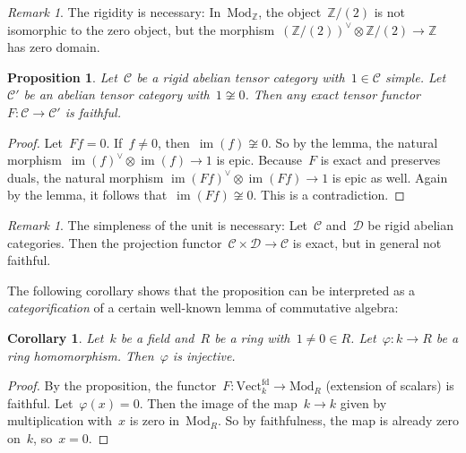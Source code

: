 \documentclass[a4paper,english,12pt]{scrartcl}
\theoremstyle{definition}
\theoremstyle{plain}
\newtheorem{prop}[defn]{Proposition}
\newtheorem{cor}[defn]{Corollary}
\theoremstyle{remark}
\newtheorem{rem}[defn]{Remark}
\newcommand{\ZZ}{\mathbb{Z}}
\newcommand{\C}{\mathcal{C}}
\newcommand{\D}{\mathcal{D}}
\renewcommand{\_}{\mathpunct{.}\,}
\newcommand{\?}{\,{:}\,}
\newcommand{\Mod}{\mathrm{Mod}}
\newcommand{\Vect}{\mathrm{Vect}}
\newcommand{\im}{\operatorname{im}}
\begin{document}
\begin{rem}The rigidity is necessary: In~$\Mod_\ZZ$, the object~$\ZZ/(2)$ is
not isomorphic to the zero object, but the morphism~$(\ZZ/(2))^\vee \otimes
\ZZ/(2) \to \ZZ$ has zero domain.\end{rem}

\begin{prop}Let~$\C$ be a rigid abelian tensor category with~$1 \in \C$ simple.
Let~$\C'$ be an abelian tensor category with~$1 \not\cong 0$. Then any exact
tensor functor~$F : \C \to \C'$ is faithful.\end{prop}
\begin{proof}Let~$Ff = 0$. If~$f \neq 0$, then~$\im(f) \not\cong 0$. So by the
lemma, the natural morphism~$\im(f)^\vee \otimes \im(f) \to 1$ is epic.
Because~$F$ is exact and preserves duals, the natural morphism
$\im(Ff)^\vee \otimes \im(Ff) \to 1$ is epic as well. Again by the lemma, it
follows that~$\im(Ff) \not\cong 0$. This is a contradiction.\end{proof}

\begin{rem}The simpleness of the unit is necessary: Let~$\C$ and~$\D$ be rigid abelian
categories. Then the projection functor~$\C \times \D \to \C$
is exact, but in general not faithful.\end{rem}

The following corollary shows that the proposition can be interpreted as a
\emph{categorification} of a certain well-known lemma of commutative algebra:

\begin{cor}Let~$k$ be a field and~$R$ be a ring with~$1 \neq 0 \in R$.
Let~$\varphi : k \to R$ be a ring homomorphism. Then~$\varphi$ is
injective.\end{cor}
\begin{proof}By the proposition, the functor~$F : \Vect_k^\mathrm{fd} \to
\Mod_R$ (extension of scalars) is faithful. Let~$\varphi(x) = 0$. Then the
image of the map~$k \to k$ given by multiplication with~$x$ is zero in~$\Mod_R$. So by
faithfulness, the map is already zero on~$k$, so~$x = 0$.\end{proof}
\end{document}
